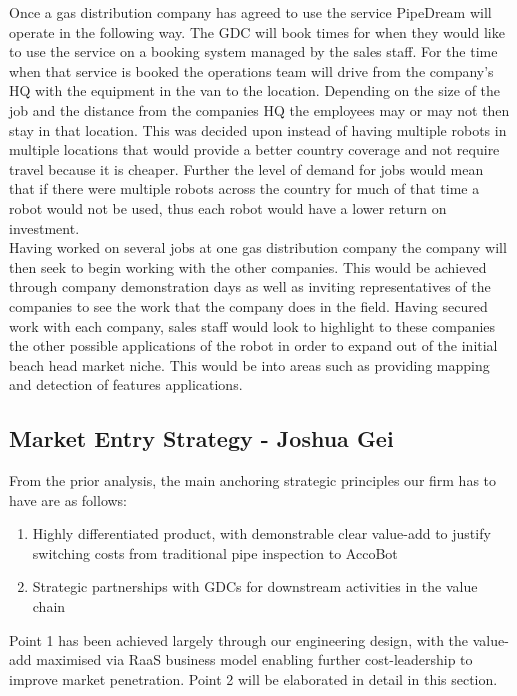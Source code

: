 \documentclass[11pt]{article}		%
\begin{document}
	       Once a gas distribution company has agreed to use the service PipeDream will operate in the following way.
	       The GDC will book times for when they would like to use the service on a booking system  managed by the sales staff. For the time when that service is booked the operations team will drive from the company’s HQ with the equipment in the van to the location. Depending on the size of the job and the distance from the companies HQ the employees may or may not then stay in that location. This was decided upon instead of having multiple robots in multiple locations that would provide a better country coverage and not require travel because it is cheaper. Further the level of demand for jobs would mean that if there were multiple robots across the country for much of that time a robot would not be used, thus each robot would have a lower return on investment.
	     \\ \hspace*{3ex}
            Having worked on several jobs at one gas distribution company the company will then seek to begin working with the other companies. This would be achieved through company demonstration days as well as inviting representatives of the companies to see the work that the company does in the field. Having secured work with each company, sales staff would look to highlight to these companies the other possible applications of the robot in order to expand out of the initial beach head market niche. This would be into areas such as providing mapping and detection of features applications.
    
    \subsection[Market Entry Strategy]{Market Entry Strategy - Joshua Gei} \label{marketEntry}
    	From the prior analysis, the main anchoring strategic principles our firm has to have are as follows: 
        \begin{enumerate}
        \item Highly differentiated product, with demonstrable clear value-add to justify switching costs from traditional pipe inspection to AccoBot
        \item Strategic partnerships with GDCs for downstream activities in the value chain
        \end{enumerate}
    Point 1 has been achieved largely through our engineering design, with the value-add maximised via RaaS business model enabling further cost-leadership to improve market penetration. Point 2 will be elaborated in detail in this section.  
    
\end{document}
